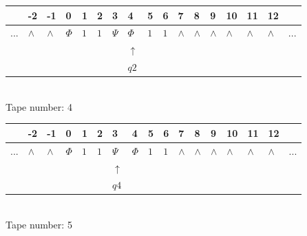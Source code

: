 \documentclass[11pt]{article}
\begin{document}
\begin{table}[H]
\centering
\begin{tabular}{lllllllllllllllll}
 & -2 & -1 & 0 & 1 & 2 & 3 & 4 & 5 & 6 & 7 & 8 & 9 & 10 & 11 & 12 & \\
\hline
$...$ & \multicolumn{1}{|l|}{$\wedge$} & \multicolumn{1}{|l|}{$\wedge$} & \multicolumn{1}{|l|}{$\Phi$} & \multicolumn{1}{|l|}{$1$} & \multicolumn{1}{|l|}{$1$} & \multicolumn{1}{|l|}{$\Psi$} & \multicolumn{1}{|l|}{$\Phi$} & \multicolumn{1}{|l|}{$1$} & \multicolumn{1}{|l|}{$1$} & \multicolumn{1}{|l|}{$\wedge$} & \multicolumn{1}{|l|}{$\wedge$} & \multicolumn{1}{|l|}{$\wedge$} & \multicolumn{1}{|l|}{$\wedge$} & \multicolumn{1}{|l|}{$\wedge$} & \multicolumn{1}{|l|}{$\wedge$} & $...$\\
\hline
&  &  &  &  &  &  & $\uparrow$ &  &  &  &  &  &  &  &  &  \\
&  &  &  &  &  &  & $ q2 $ &  &  &  &  &  &  &  &  &  \\
\end{tabular}
\\
Tape number: 4
\noindent\makebox[\linewidth]{\hdashrule{\textwidth}{1pt}{1pt}}\end{table}

\begin{table}[H]
\centering
\begin{tabular}{lllllllllllllllll}
 & -2 & -1 & 0 & 1 & 2 & 3 & 4 & 5 & 6 & 7 & 8 & 9 & 10 & 11 & 12 & \\
\hline
$...$ & \multicolumn{1}{|l|}{$\wedge$} & \multicolumn{1}{|l|}{$\wedge$} & \multicolumn{1}{|l|}{$\Phi$} & \multicolumn{1}{|l|}{$1$} & \multicolumn{1}{|l|}{$1$} & \multicolumn{1}{|l|}{$\Psi$} & \multicolumn{1}{|l|}{$\Phi$} & \multicolumn{1}{|l|}{$1$} & \multicolumn{1}{|l|}{$1$} & \multicolumn{1}{|l|}{$\wedge$} & \multicolumn{1}{|l|}{$\wedge$} & \multicolumn{1}{|l|}{$\wedge$} & \multicolumn{1}{|l|}{$\wedge$} & \multicolumn{1}{|l|}{$\wedge$} & \multicolumn{1}{|l|}{$\wedge$} & $...$\\
\hline
&  &  &  &  &  & $\uparrow$ &  &  &  &  &  &  &  &  &  &  \\
&  &  &  &  &  & $ q4 $ &  &  &  &  &  &  &  &  &  &  \\
\end{tabular}
\\
Tape number: 5
\noindent\makebox[\linewidth]{\hdashrule{\textwidth}{1pt}{1pt}}\end{table}
\clearpage
\end{document}
